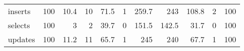 \begin{tabular}{lrrrrrrrrrr}
 inserts      &          100 &                10.4 &                    10 &                            71.5 &                                 1 &                           259.7 &                             243   &                          108.8 &                                2 &                              100 \\
 selects      &          100 &                 3   &                     2 &                            39.7 &                                 0 &                           151.5 &                             142.5 &                           31.7 &                                0 &                              100 \\
 updates      &          100 &                11.2 &                    11 &                            65.7 &                                 1 &                           245   &                             240   &                           67.7 &                                1 &                              100 \\
\hline
\end{tabular}